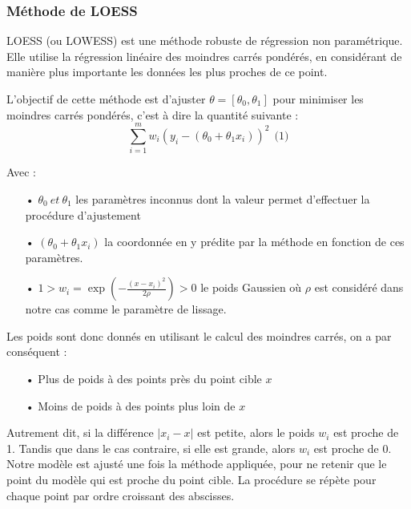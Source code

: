 \documentclass[a4paper,12pt]{article} %
\begin{document}
                    
			    \subsubsection{\label{partie_loess}Méthode de LOESS}
			    
                    LOESS (ou LOWESS) est une méthode robuste de régression non paramétrique. Elle utilise la régression linéaire des moindres carrés pondérés, en considérant de manière plus importante les données les plus proches de ce point.
                    
                    L'objectif de cette méthode est d'ajuster $\theta = [\theta_0, \theta_1]$ pour minimiser les moindres carrés pondérés, c'est à dire la quantité suivante : \[\sum_{i=1}^m w_i ( y_i - (\theta_0 + \theta_1 x_i))^2 \ \ \text{(1)}\]
                    
                    Avec : 
                    \begin{itemize}
                        \item[•]  $\theta_0 \ et \ \theta_1$ les paramètres inconnus dont la valeur permet d'effectuer la procédure d'ajustement  
                        \item[•]  $(\theta_0 + \theta_1 x_i)$ la coordonnée en y prédite par la méthode en fonction de ces paramètres.
                        \item[•]  $1 > w_i = \exp \left( - \frac{(x -x_i)^2}{2 \rho} \right) > 0$ le poids Gaussien où  $\rho$ est considéré dans notre cas comme le paramètre de lissage.
                    \end{itemize}
                    
                    Les poids sont donc donnés en utilisant le calcul des moindres carrés, on a par conséquent :
                    \begin{itemize}
                        \item[•] Plus de poids à des points près du point cible $x$ 
                        \item[•] Moins de poids à des points plus loin de $x$
                    \end{itemize}
                    Autrement dit, si la différence $| x_i - x |$ est petite, alors le poids $w_i$ est proche de 1. Tandis que dans le cas contraire, si elle est grande, alors $w_i$ est proche de 0. 
                    Notre modèle est ajusté une fois la méthode appliquée, pour ne retenir que le point du modèle qui est proche du point cible. La procédure se répète pour chaque point par ordre croissant des abscisses.
                    
\end{document}
